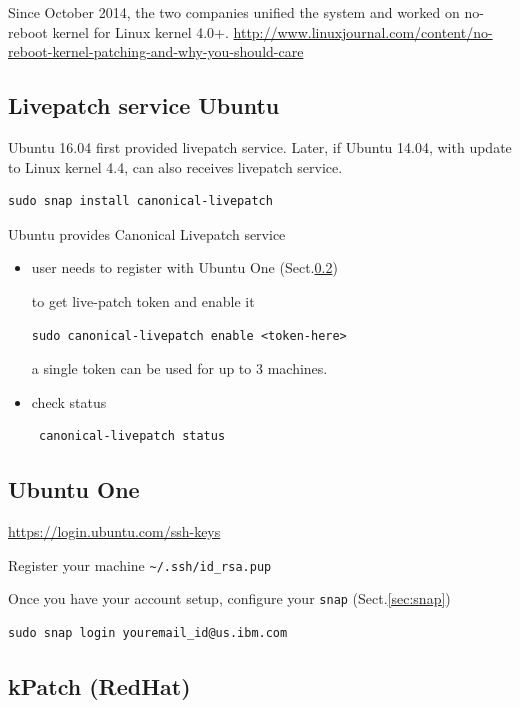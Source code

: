 Since October 2014, the two companies unified the system and worked on no-reboot
kernel for Linux kernel 4.0+.
\url{http://www.linuxjournal.com/content/no-reboot-kernel-patching-and-why-you-should-care}

\subsection{Livepatch service Ubuntu}

Ubuntu 16.04 first provided livepatch service. Later, if Ubuntu 14.04, with
update to Linux kernel 4.4, can also receives livepatch service.
\begin{verbatim}
sudo snap install canonical-livepatch
\end{verbatim}


Ubuntu provides Canonical Livepatch service 
\begin{itemize}
  \item user needs to register with Ubuntu One (Sect.\ref{sec:Ubuntu-One})
  
  to get live-patch token and enable it
\begin{verbatim}
sudo canonical-livepatch enable <token-here>
\end{verbatim}
a single token can be used for up to 3 machines.  
  
  \item check status
  
\begin{verbatim}
 canonical-livepatch status
\end{verbatim}
\end{itemize}

\subsection{Ubuntu One}
\label{sec:Ubuntu-One}

\url{https://login.ubuntu.com/ssh-keys}

Register your machine \verb!~/.ssh/id_rsa.pup! 

Once you have your account setup, configure your \verb!snap!
(Sect.\ref{sec:snap})
\begin{verbatim}
sudo snap login youremail_id@us.ibm.com
\end{verbatim}



\subsection{kPatch (RedHat)}

